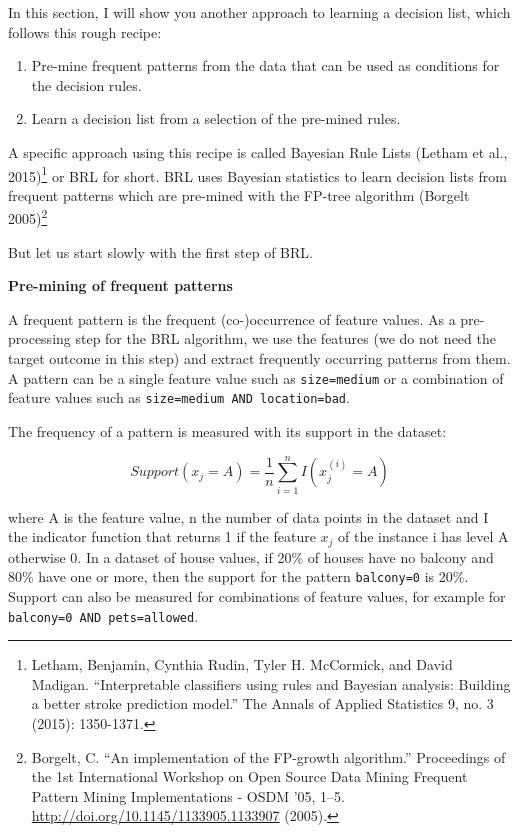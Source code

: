 \documentclass[
  11pt,
]{scrbook}
\providecommand{\tightlist}{%
  \setlength{\itemsep}{0pt}\setlength{\parskip}{0pt}}
\begin{document}
In this section, I will show you another approach to learning a decision list, which follows this rough recipe:

\begin{enumerate}
\def\labelenumi{\arabic{enumi}.}
\tightlist
\item
  Pre-mine frequent patterns from the data that can be used as conditions for the decision rules.
\item
  Learn a decision list from a selection of the pre-mined rules.
\end{enumerate}

A specific approach using this recipe is called Bayesian Rule Lists (Letham et al., 2015)\footnote{Letham, Benjamin, Cynthia Rudin, Tyler H. McCormick, and David Madigan. ``Interpretable classifiers using rules and Bayesian analysis: Building a better stroke prediction model.'' The Annals of Applied Statistics 9, no. 3 (2015): 1350-1371.} or BRL for short.
BRL uses Bayesian statistics to learn decision lists from frequent patterns which are pre-mined with the FP-tree algorithm (Borgelt 2005)\footnote{Borgelt, C. ``An implementation of the FP-growth algorithm.'' Proceedings of the 1st International Workshop on Open Source Data Mining Frequent Pattern Mining Implementations - OSDM '05, 1--5. \url{http://doi.org/10.1145/1133905.1133907} (2005).}

But let us start slowly with the first step of BRL.

\textbf{Pre-mining of frequent patterns}

A frequent pattern is the frequent (co-)occurrence of feature values.
As a pre-processing step for the BRL algorithm, we use the features (we do not need the target outcome in this step) and extract frequently occurring patterns from them.
A pattern can be a single feature value such as \texttt{size=medium} or a combination of feature values such as \texttt{size=medium\ AND\ location=bad}.

The frequency of a pattern is measured with its support in the dataset:

\[Support(x_j=A)=\frac{1}n{}\sum_{i=1}^nI(x^{(i)}_{j}=A)\]

where A is the feature value, n the number of data points in the dataset and I the indicator function that returns 1 if the feature \(x_j\) of the instance i has level A otherwise 0.
In a dataset of house values, if 20\% of houses have no balcony and 80\% have one or more, then the support for the pattern \texttt{balcony=0} is 20\%.
Support can also be measured for combinations of feature values, for example for \texttt{balcony=0\ AND\ pets=allowed}.
\end{document}
